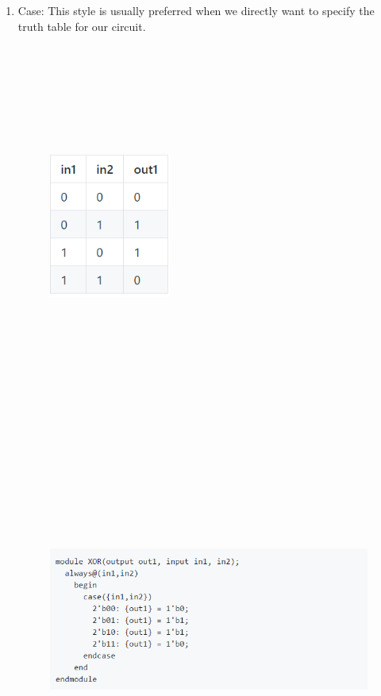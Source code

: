 \documentclass[11pt]{article}
\begin{document}
\begin{enumerate}
\item Case: 
This style is usually preferred when we directly want to specify the truth table for our circuit.\bigskip
\begin{figure}[ht!]
\centering
\includegraphics[width=4cm,height=12cm,keepaspectratio]{fig_1.png}
\includegraphics[width=11cm,height=14cm,keepaspectratio]{Screenshot_2.png}
\label{Case exmaple}
\end{figure}


\end{enumerate}
\end{document}
